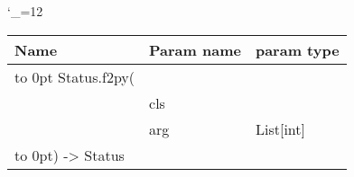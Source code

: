 \begingroup \catcode`\_=12 \tt
\begin{tabular}{lll}
\toprule
\textrm{Name}&\textrm{Param name}&\textrm{param type}\\
\midrule
\hbox to 0pt {Status.f2py(\hss}\\
& cls\\
& arg & List[int]\\
\hbox to 0pt{) -> Status\hss}\\
\bottomrule
\end{tabular}
\endgroup
